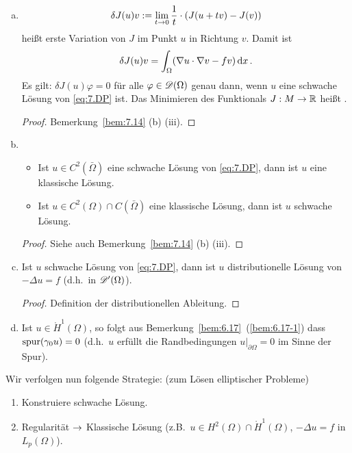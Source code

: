 \begin{bem}
  \label{bem:7.15}
  \begin{enumerate}[(a)]
  \item \[ \delta J(u)v:=\lim_{t\rightarrow 0}\frac 1t\cdot(J(u+tv)-J(v)) \]
    heißt erste Variation von $J$ im Punkt $u$ in Richtung $v$. Damit ist
    \[ \delta  J(u) v=\int_\Omega(\nabla u\cdot\nabla v-fv)\,\mathrm{d} x\, . \]
    Es gilt: $\delta J(u)\varphi=0$ für alle $\varphi\in\mathscr{D}(\Omega)$ genau dann, wenn $u$ eine schwache Lösung von \eqref{eq:7.DP} ist. Das Minimieren des Funktionals $J:M\rightarrow \mathbb{R}$ heißt .
    \begin{proof}
      Bemerkung~\ref{bem:7.14} (b) (iii).
    \end{proof}
  \item
    \begin{itemize}
    \item Ist $u\in C^2(\bar\Omega)$ eine schwache Lösung von \eqref{eq:7.DP}, dann ist $u$ eine klassische Lösung.
    \item Ist $u\in C^2(\Omega)\cap C(\bar\Omega)$ eine klassische Lösung, dann ist $u$ schwache Lösung.      
    \end{itemize}
    \begin{proof}
      Siehe auch Bemerkung~\ref{bem:7.14} (b) (iii).
    \end{proof}
  \item Ist $u$ schwache Lösung von \eqref{eq:7.DP}, dann ist $u$ distributionelle Lösung von $-\Delta u=f$ (d.h.\ in $\mathscr{D}'(\Omega)$).
    \begin{proof}
      Definition der distributionellen Ableitung.
    \end{proof}
  \item Ist $u\in\mathring H^1(\Omega)$, so folgt aus Bemerkung~\ref{bem:6.17}~(\ref{bem:6.17-1}) dass $\operatorname{spur}(\gamma_0 u)=0$ (d.h.\ $u$ erfüllt die Randbedingungen $u\rvert_{\partial\Omega}=0$ im Sinne der Spur).
  \end{enumerate}
\end{bem}

Wir verfolgen nun folgende Strategie: (zum Lösen elliptischer Probleme)
\begin{enumerate}[(1)]
\item Konstruiere schwache Lösung.
\item Regularität $\rightarrow$ Klassische Lösung (z.B.\ $u\in H^2(\Omega)\cap\mathring H^1(\Omega)$, $-\Delta u=f$ in $L_p(\Omega)$).
\end{enumerate}

